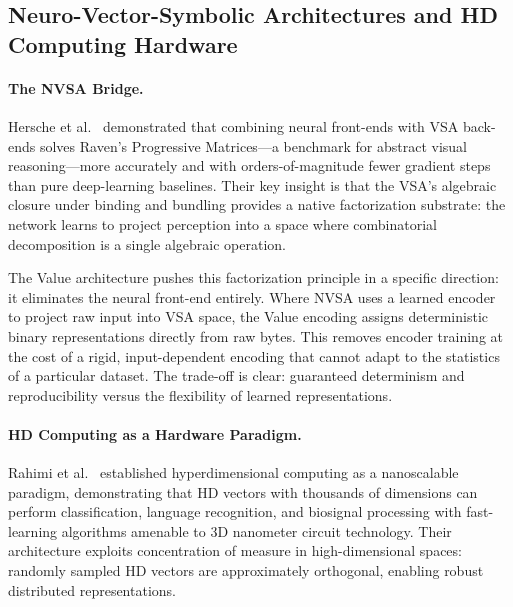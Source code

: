 \subsection{Neuro-Vector-Symbolic Architectures and HD Computing Hardware}
\label{sec:related_nvsa}

\paragraph{The NVSA Bridge.}
Hersche et al.\ \citep{hersche2023nvsa} demonstrated that combining
neural front-ends with VSA back-ends solves Raven's Progressive
Matrices---a benchmark for abstract visual reasoning---more accurately
and with orders-of-magnitude fewer gradient steps than pure deep-learning
baselines.  Their key insight is that the VSA's algebraic closure under
binding and bundling provides a native factorization substrate: the
network learns to project perception into a space where combinatorial
decomposition is a single algebraic operation.

The Value architecture pushes this factorization principle in a specific
direction: it eliminates the neural front-end entirely.  Where NVSA uses
a learned encoder to project raw input into VSA space, the Value
encoding assigns deterministic binary representations directly from raw
bytes.  This removes encoder training at the cost of a rigid,
input-dependent encoding that cannot adapt to the statistics of a
particular dataset.  The trade-off is clear: guaranteed determinism and
reproducibility versus the flexibility of learned representations.

\paragraph{HD Computing as a Hardware Paradigm.}
Rahimi et al.\ \citep{rahimi2017hd} established hyperdimensional
computing as a nanoscalable paradigm, demonstrating that HD vectors with
thousands of dimensions can perform classification, language recognition,
and biosignal processing with fast-learning algorithms amenable to 3D
nanometer circuit technology.  Their architecture exploits concentration
of measure in high-dimensional spaces: randomly sampled HD vectors are
approximately orthogonal, enabling robust distributed representations.

